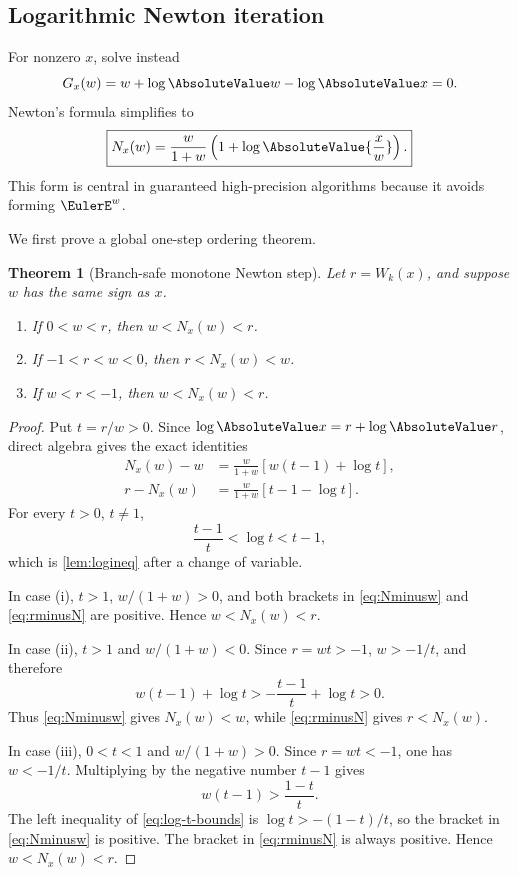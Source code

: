 \documentclass[11pt]{article}
\newtheorem{theorem}{Theorem}[section]
\theoremstyle{remark}
\begin{document}
\subsection{Logarithmic Newton iteration}

For nonzero \(x\), solve instead
\[
       G_x(w)=w+\log\AbsoluteValue w-\log\AbsoluteValue x=0.
\]
Newton's formula simplifies to
\begin{equation}\label{eq:lognewton}
 \boxed{\displaystyle
 N_x(w)=\frac{w}{1+w}
 \left(1+\log\AbsoluteValue{\frac{x}{w}}\right).}
\end{equation}
This form is central in guaranteed high-precision algorithms because it
avoids forming \(\EulerE^w\).

We first prove a global one-step ordering theorem.

\begin{theorem}[Branch-safe monotone Newton step]\label{thm:lognewton-order}
Let \(r=W_k(x)\), and suppose \(w\) has the same sign as \(x\).
\begin{enumerate}[label=\textup{(\roman*)}]
\item If \(0<w<r\), then \(w<N_x(w)<r\).
\item If \(-1<r<w<0\), then \(r<N_x(w)<w\).
\item If \(w<r<-1\), then \(w<N_x(w)<r\).
\end{enumerate}
\end{theorem}

\begin{proof}
Put \(t=r/w>0\).  Since
\(\log\AbsoluteValue x=r+\log\AbsoluteValue r\), direct algebra gives the exact identities
\begin{align}
 N_x(w)-w
 &=\frac{w}{1+w}\left[w(t-1)+\log t\right],
 \label{eq:Nminusw}\\
 r-N_x(w)
 &=\frac{w}{1+w}\left[t-1-\log t\right].
 \label{eq:rminusN}
\end{align}
For every \(t>0\), \(t\neq1\),
\begin{equation}\label{eq:log-t-bounds}
       \frac{t-1}{t}<\log t<t-1,
\end{equation}
which is \cref{lem:logineq} after a change of variable.

In case (i), \(t>1\), \(w/(1+w)>0\), and both brackets in
\eqref{eq:Nminusw} and \eqref{eq:rminusN} are positive.  Hence
\(w<N_x(w)<r\).

In case (ii), \(t>1\) and \(w/(1+w)<0\).  Since \(r=wt>-1\),
\(w>-1/t\), and therefore
\[
 w(t-1)+\log t
 >-\frac{t-1}{t}+\log t>0.
\]
Thus \eqref{eq:Nminusw} gives \(N_x(w)<w\), while
\eqref{eq:rminusN} gives \(r<N_x(w)\).

In case (iii), \(0<t<1\) and \(w/(1+w)>0\).  Since \(r=wt<-1\),
one has \(w<-1/t\).  Multiplying by the negative number \(t-1\) gives
\[
 w(t-1)>\frac{1-t}{t}.
\]
The left inequality of \eqref{eq:log-t-bounds} is
\(\log t>-(1-t)/t\), so the bracket in \eqref{eq:Nminusw} is positive.
The bracket in \eqref{eq:rminusN} is always positive.  Hence
\(w<N_x(w)<r\).
\end{proof}
\end{document}
